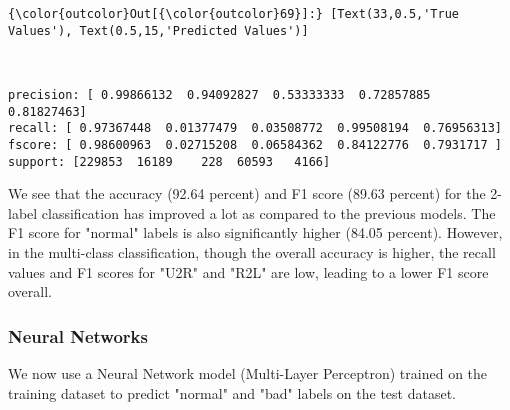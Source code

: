 \documentclass[11pt]{article}
\begin{document}
\begin{Verbatim}[commandchars=\\\{\}]
{\color{outcolor}Out[{\color{outcolor}69}]:} [Text(33,0.5,'True Values'), Text(0.5,15,'Predicted Values')]
\end{Verbatim}
            
    \begin{center}
    \end{center}
    { \hspace*{\fill} \\}
    
    \begin{Verbatim}[commandchars=\\\{\}]
precision: [ 0.99866132  0.94092827  0.53333333  0.72857885  0.81827463]
recall: [ 0.97367448  0.01377479  0.03508772  0.99508194  0.76956313]
fscore: [ 0.98600963  0.02715208  0.06584362  0.84122776  0.7931717 ]
support: [229853  16189    228  60593   4166]

    \end{Verbatim}

    We see that the accuracy (92.64 percent) and F1 score (89.63 percent)
for the 2-label classification has improved a lot as compared to the
previous models. The F1 score for "normal" labels is also significantly
higher (84.05 percent). However, in the multi-class classification,
though the overall accuracy is higher, the recall values and F1 scores
for "U2R" and "R2L" are low, leading to a lower F1 score overall.

    \subsubsection{Neural Networks}\label{neural-networks}

We now use a Neural Network model (Multi-Layer Perceptron) trained on
the training dataset to predict "normal" and "bad" labels on the test
dataset.
\end{document}
